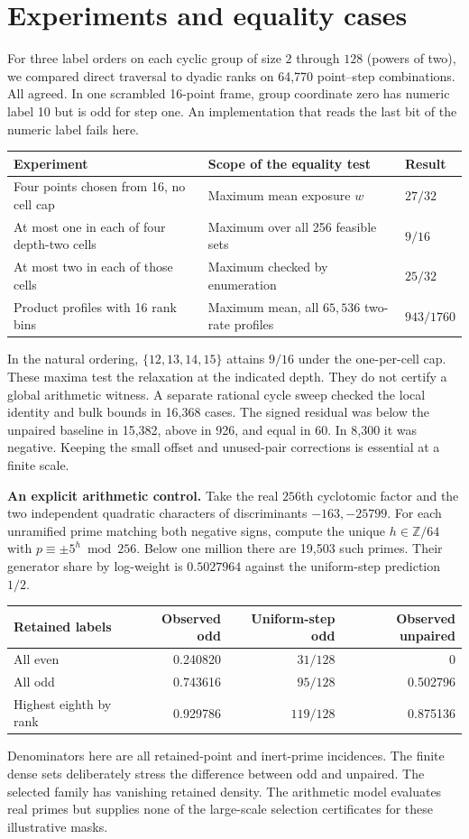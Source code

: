 \documentclass[12pt,letterpaper]{article}
\newcommand{\para}[1]{\par\medskip\noindent\textbf{#1}\quad}
\newcommand{\pagepart}[1]{\clearpage\section{#1}}
\begin{document}
\pagepart{Experiments and equality cases}
For three label orders on each cyclic group of size \(2\) through \(128\) (powers of two), we compared direct traversal to dyadic ranks on 64,770 point--step combinations. All agreed. In one scrambled 16-point frame, group coordinate zero has numeric label 10 but is odd for step one. An implementation that reads the last bit of the numeric label fails here.

\begin{center}\begin{tabularx}{\linewidth}{@{}YYl@{}}
\toprule
Experiment & Scope of the equality test & Result\\\midrule
Four points chosen from 16, no cell cap & Maximum mean exposure \(w\) & \(27/32\)\\
At most one in each of four depth-two cells & Maximum over all 256 feasible sets & \(9/16\)\\
At most two in each of those cells & Maximum checked by enumeration & \(25/32\)\\
Product profiles with 16 rank bins & Maximum mean, all \(65{,}536\) two-rate profiles & \(943/1760\)\\\bottomrule
\end{tabularx}\end{center}
In the natural ordering, \(\{12,13,14,15\}\) attains \(9/16\) under the one-per-cell cap. These maxima test the relaxation at the indicated depth. They do not certify a global arithmetic witness. A separate rational cycle sweep checked the local identity and bulk bounds in 16,368 cases. The signed residual was below the unpaired baseline in 15,382, above in 926, and equal in 60. In 8,300 it was negative. Keeping the small offset and unused-pair corrections is essential at a finite scale.

\para{An explicit arithmetic control.} Take the real \(256\)th cyclotomic factor and the two independent quadratic characters of discriminants \(-163,-25799\). For each unramified prime matching both negative signs, compute the unique \(h\in\mathbb Z/64\) with \(p\equiv\pm 5^h\bmod256\). Below one million there are 19,503 such primes. Their generator share by log-weight is \(0.5027964\) against the uniform-step prediction \(1/2\).
\begin{center}\begin{tabular}{@{}lrrr@{}}
\toprule
Retained labels & Observed odd & Uniform-step odd & Observed unpaired\\\midrule
All even & 0.240820 & \(31/128\) & 0\\
All odd & 0.743616 & \(95/128\) & 0.502796\\
Highest eighth by rank & 0.929786 & \(119/128\) & 0.875136\\\bottomrule
\end{tabular}\end{center}
Denominators here are all retained-point and inert-prime incidences. The finite dense sets deliberately stress the difference between odd and unpaired. The selected family has vanishing retained density. The arithmetic model evaluates real primes but supplies none of the large-scale selection certificates for these illustrative masks.
\end{document}
